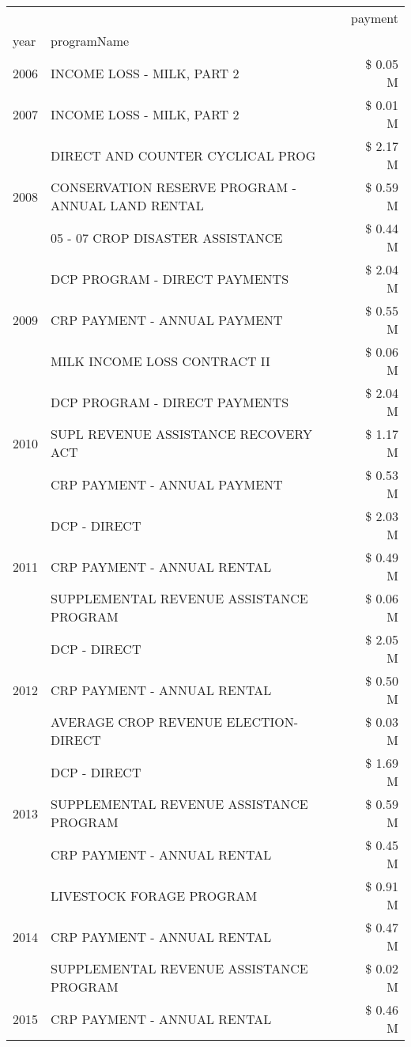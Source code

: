 \begin{tabular}{llr}
\toprule
 &  & payment \\
year & programName &  \\
\midrule
2006 & INCOME LOSS - MILK, PART 2 & \$ 0.05 M \\
\cline{1-3}
2007 & INCOME LOSS - MILK, PART 2 & \$ 0.01 M \\
\cline{1-3}
\multirow[t]{3}{*}{2008} & DIRECT AND COUNTER CYCLICAL PROG & \$ 2.17 M \\
 & CONSERVATION RESERVE PROGRAM - ANNUAL LAND RENTAL & \$ 0.59 M \\
 & 05 - 07 CROP DISASTER ASSISTANCE & \$ 0.44 M \\
\cline{1-3}
\multirow[t]{3}{*}{2009} & DCP PROGRAM - DIRECT PAYMENTS & \$ 2.04 M \\
 & CRP PAYMENT - ANNUAL PAYMENT & \$ 0.55 M \\
 & MILK INCOME LOSS CONTRACT II & \$ 0.06 M \\
\cline{1-3}
\multirow[t]{3}{*}{2010} & DCP PROGRAM - DIRECT PAYMENTS & \$ 2.04 M \\
 & SUPL REVENUE ASSISTANCE RECOVERY ACT & \$ 1.17 M \\
 & CRP PAYMENT - ANNUAL PAYMENT & \$ 0.53 M \\
\cline{1-3}
\multirow[t]{3}{*}{2011} & DCP - DIRECT & \$ 2.03 M \\
 & CRP PAYMENT - ANNUAL RENTAL & \$ 0.49 M \\
 & SUPPLEMENTAL REVENUE ASSISTANCE PROGRAM & \$ 0.06 M \\
\cline{1-3}
\multirow[t]{3}{*}{2012} & DCP - DIRECT & \$ 2.05 M \\
 & CRP PAYMENT - ANNUAL RENTAL & \$ 0.50 M \\
 & AVERAGE CROP REVENUE ELECTION-DIRECT & \$ 0.03 M \\
\cline{1-3}
\multirow[t]{3}{*}{2013} & DCP - DIRECT & \$ 1.69 M \\
 & SUPPLEMENTAL REVENUE ASSISTANCE PROGRAM & \$ 0.59 M \\
 & CRP PAYMENT - ANNUAL RENTAL & \$ 0.45 M \\
\cline{1-3}
\multirow[t]{3}{*}{2014} & LIVESTOCK FORAGE PROGRAM & \$ 0.91 M \\
 & CRP PAYMENT - ANNUAL RENTAL & \$ 0.47 M \\
 & SUPPLEMENTAL REVENUE ASSISTANCE PROGRAM & \$ 0.02 M \\
\cline{1-3}
\multirow[t]{3}{*}{2015} & CRP PAYMENT - ANNUAL RENTAL & \$ 0.46 M \\

\end{tabular}
